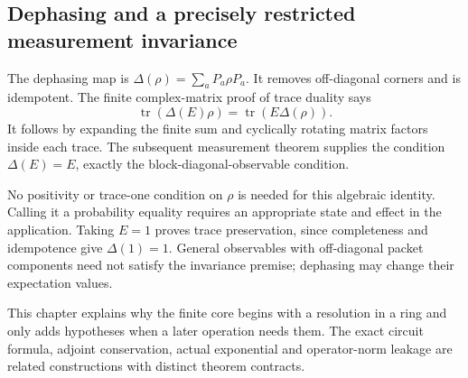 
\subsection{Dephasing and a precisely restricted measurement invariance}
The dephasing map is $\Delta(\rho)=\sum_aP_a\rho P_a$. It removes off-diagonal corners and is idempotent. The finite complex-matrix proof of trace duality says
\[
\operatorname{tr}(\Delta(E)\rho)=\operatorname{tr}(E\Delta(\rho)).
\]
It follows by expanding the finite sum and cyclically rotating matrix factors inside each trace. The subsequent measurement theorem supplies the condition $\Delta(E)=E$, exactly the block-diagonal-observable condition.


No positivity or trace-one condition on $\rho$ is needed for this algebraic identity. Calling it a probability equality requires an appropriate state and effect in the application. Taking $E=1$ proves trace preservation, since completeness and idempotence give $\Delta(1)=1$. General observables with off-diagonal packet components need not satisfy the invariance premise; dephasing may change their expectation values.

This chapter explains why the finite core begins with a resolution in a ring and only adds hypotheses when a later operation needs them. The exact circuit formula, adjoint conservation, actual exponential and operator-norm leakage are related constructions with distinct theorem contracts.
